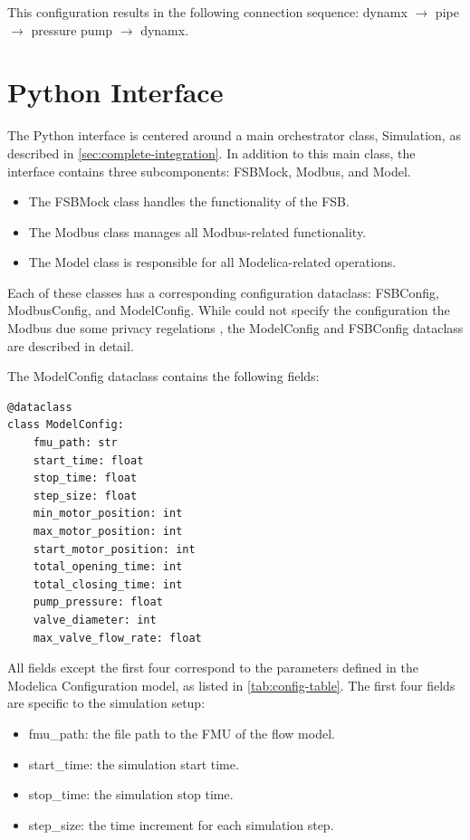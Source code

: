 \documentclass[we,final,11pt,oneside,openany]{uantwerpenbamathesis}
\begin{document}
This configuration results in the following connection sequence: dynamx $\rightarrow$ pipe $\rightarrow$ pressure pump $\rightarrow$ dynamx.

\chapter{Python Interface}
\label{ch:python-interface}

The Python interface is centered around a main orchestrator class, Simulation, as described in \autoref{sec:complete-integration}.
In addition to this main class, the interface contains three subcomponents: FSBMock, Modbus, and Model.
\begin{itemize}
    \item The FSBMock class handles the functionality of the FSB.
    \item The Modbus class manages all Modbus-related functionality.
    \item The Model class is responsible for all Modelica-related operations.
\end{itemize}

Each of these classes has a corresponding configuration dataclass: FSBConfig, ModbusConfig, and ModelConfig.
While could not specify the configuration the Modbus due some privacy regelations , the ModelConfig and FSBConfig dataclass are described in detail.

The ModelConfig dataclass contains the following fields:
\begin{lstlisting}[style=pythonstyle, caption={ModelConfig data fields}]
@dataclass
class ModelConfig:
    fmu_path: str
    start_time: float
    stop_time: float
    step_size: float
    min_motor_position: int
    max_motor_position: int
    start_motor_position: int
    total_opening_time: int
    total_closing_time: int
    pump_pressure: float
    valve_diameter: int
    max_valve_flow_rate: float
\end{lstlisting}

All fields except the first four correspond to the parameters defined in the Modelica Configuration model, as listed in \autoref{tab:config-table}.
The first four fields are specific to the simulation setup:
\begin{itemize}
    \item fmu\_path: the file path to the FMU of the flow model.
    \item start\_time: the simulation start time.
    \item stop\_time: the simulation stop time.
    \item step\_size: the time increment for each simulation step.
\end{itemize}
\end{document}
